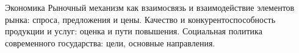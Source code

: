 \documentclass[
	11pt,
	a4paper,
	]
	{article}
\begin{document}
\vfill



\begin{minipage}[t][\miniH]{\miniL}\centering
	 {Экономика}
		{
			Рыночный механизм как взаимосвязь и взаимодействие элементов рынка: спроса, предложения и цены.
		}{
			Качество и конкурентоспособность продукции и услуг: оценка и пути повышения.
		}{
			Социальная политика современного государства: цели, основные направления.
		}
	\lowGE
\end{minipage}



	
\end{document}
